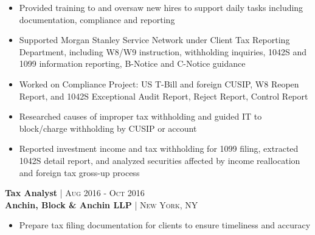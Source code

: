 \documentclass[10pt]{article} %
\begin{document}
{\begin{minipage}[t]{0.5\textwidth}
\begin{itemize}[leftmargin=*, topsep=2pt, partopsep=2.5pt]
\item Provided training to and oversaw new hires to support daily tasks including documentation, compliance and reporting
 
\item Supported Morgan Stanley Service Network under Client Tax Reporting Department, including W8/W9 instruction, withholding inquiries, 1042S and 1099 information reporting, B-Notice and C-Notice guidance

\item Worked on Compliance Project: US T-Bill and foreign CUSIP, W8 Reopen Report, and 1042S Exceptional Audit Report, Reject Report, Control Report 

\item Researched causes of improper tax withholding and guided IT to block/charge withholding by CUSIP or account

\item Reported investment income and tax withholding for 1099 filing, extracted 1042S detail report, and analyzed securities affected by income reallocation and foreign tax gross-up process

\end{itemize}


{\raggedright\normalsize
\textbf{Tax Analyst} {\hfill\footnotesize\textsc{| Aug 2016 - Oct 2016}}\\ 
\textbf{Anchin, Block \& Anchin LLP} {\hfill\footnotesize\textsc{| New York, NY}}}

\begin{itemize}[leftmargin=*, topsep=2pt, partopsep=2.5pt]
\setlength\itemsep{1pt}

\item Prepare tax filing documentation for clients to ensure timeliness and accuracy
 
\end{itemize}




\end{minipage} %
\hfill
\begin{minipage}[t]{0.47\textwidth} %
\vspace{0pt} %




\end{minipage}}
\end{document}
